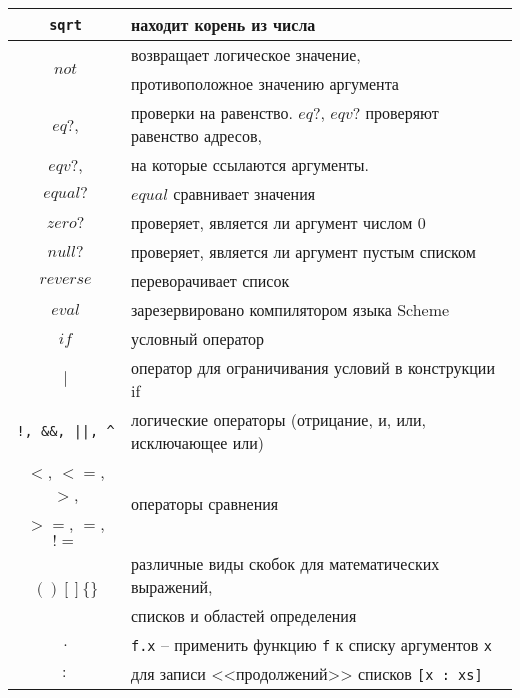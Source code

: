 \begin{itemize}
\begin{table}[ht!]
\begin{tabular}{|c|l|}
                    \verb!sqrt!                 & находит корень из числа \\ \hline
                    \multirow{2}{*}{$not$}      & возвращает логическое значение,\\
                                                & противоположное значению аргумента \\ \hline
                    $eq?$,                      & проверки на равенство. $eq?$, $eqv?$ проверяют равенство адресов,\\
                    $eqv?$,                     & на которые ссылаются аргументы.\\
                    $equal?$                    & $equal$ сравнивает значения \\ \hline
                    $zero?$                     & проверяет, является ли аргумент числом 0 \\ \hline
                    $null?$                     & проверяет, является ли аргумент пустым списком \\ \hline
                    $reverse$                   & переворачивает список \\ \hline
                    $eval$                      & зарезервировано компилятором языка Scheme \\ \hline
                    $if$                        & условный оператор \\ \hline
                    $|$                         & оператор для ограничивания условий в конструкции if \\ \hline
                    \verb$!, &&, ||, ^$         & логические операторы (отрицание, и, или, исключающее или) \\ \hline
                    $<$, $<=$, $>$,             & \multirow{2}{*}{операторы сравнения} \\
                    $>=$, $=$, $!=$             & \\ \hline
                    \multirow{2}{*}{$( ) [ ] \{ \}$} & различные виды скобок для математических выражений,\\
                                                & списков и областей определения} \\ \hline
                    $.$                         & \verb,f.x, -- применить функцию \verb,f, к списку аргументов \verb,x, \\ \hline
                    $:$                         & для записи <<продолжений>> списков \verb,[x : xs], \\ \hline

\end{tabular}
\end{table}
\end{itemize}
